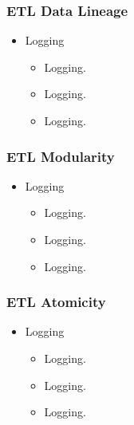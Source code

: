 
\begin{frame}
    \frametitle{ETL Data Lineage}
    \begin{itemize}[<+->]
        \item Logging
        \begin{itemize}[<+->]
            \item  Logging.
            \item  Logging.
            \item  Logging.


        \end{itemize}
    \end{itemize}
\end{frame}


\begin{frame}
    \frametitle{ETL Modularity}
    \begin{itemize}[<+->]
        \item Logging
        \begin{itemize}[<+->]
            \item  Logging.
            \item  Logging.
            \item  Logging.


        \end{itemize}
    \end{itemize}
\end{frame}


\begin{frame}
    \frametitle{ETL Atomicity}
    \begin{itemize}[<+->]
        \item Logging
        \begin{itemize}[<+->]
            \item  Logging.
            \item  Logging.
            \item  Logging.


        \end{itemize}
    \end{itemize}
\end{frame}

